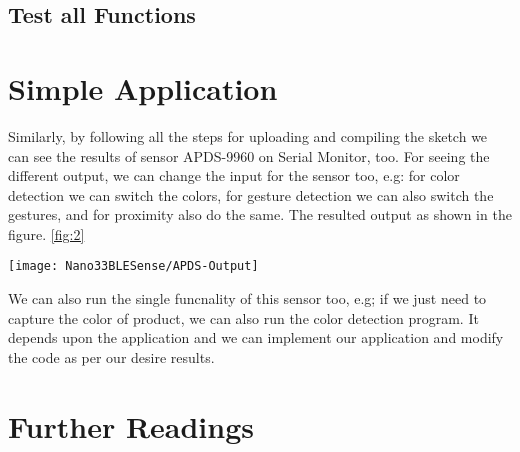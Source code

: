 \subsection{Test all Functions}

\section{Simple Application}

Similarly, by following all the steps for uploading and compiling the sketch we can see the results of sensor APDS-9960  on Serial Monitor, too. For seeing the different output, we can change the input for the sensor too, e.g: for color detection we can switch the colors, for gesture detection we can also switch the gestures, and for proximity also do the same. The resulted output as shown in the figure.  \ref{fig:2} 


\begin{center}
	\texttt{[image: Nano33BLESense/APDS-Output]}
	\label{fig:2}
\end{center}

We can also run the single funcnality of this sensor too, e.g; if we just need to capture the color of product, we can also run the color detection program. It depends upon the application and we can implement our application and modify the code as per our desire results.


{
	\label{TestAPDS9960}
}






\section{Further Readings}

